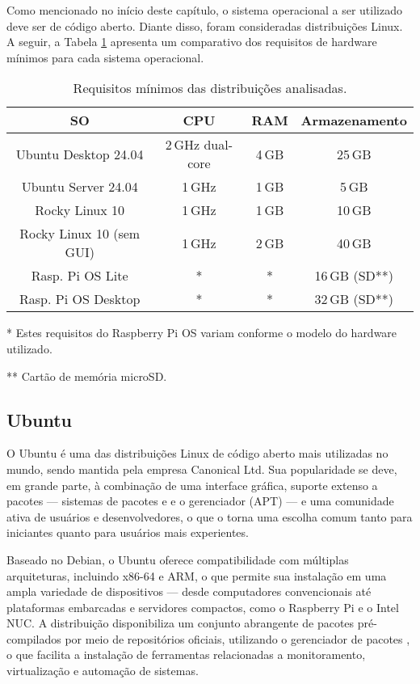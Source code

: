 Como mencionado no início deste capítulo, o sistema operacional a ser utilizado deve ser de código aberto. Diante disso, 
foram consideradas distribuições Linux. A seguir, a Tabela \ref{tab:requisitos-minimos} apresenta um comparativo dos requisitos de hardware mínimos para cada sistema operacional.

\begin{table}[H]
\centering
\caption{Requisitos mínimos das distribuições analisadas.}
\label{tab:requisitos-minimos}
\begin{tabular}{@{}c c c c@{}}
\toprule
\textbf{SO} & \textbf{CPU} & \textbf{RAM} & \textbf{Armazenamento} \\
\midrule
Ubuntu Desktop 24.04 & 2\,GHz dual-core & 4\,GB & 25\,GB \\
Ubuntu Server 24.04 & 1\,GHz & 1\,GB & 5\,GB \\
Rocky Linux 10 & 1\,GHz & 1\,GB & 10\,GB \\
Rocky Linux 10 (sem GUI) & 1\,GHz & 2\,GB & 40\,GB \\
Rasp. Pi OS Lite & * & * & 16\,GB (SD**) \\
Rasp. Pi OS Desktop & * & * & 32\,GB (SD**) \\
\bottomrule
\end{tabular}
\begin{flushleft}
\footnotesize

* Estes requisitos do Raspberry Pi OS variam conforme o modelo do hardware utilizado.

** Cartão de memória microSD.
\end{flushleft}
\end{table}

\subsection{Ubuntu}
\label{subsection:Ubuntu}

O Ubuntu \citep{ubuntudsktp2025} é uma das distribuições Linux de código aberto mais utilizadas no mundo, sendo mantida pela empresa Canonical Ltd. Sua popularidade se deve, em grande parte, à combinação de uma interface gráfica, suporte extenso a pacotes --- sistemas de pacotes  e  e o gerenciador  (APT) ---  e uma comunidade ativa de usuários e desenvolvedores, o que o torna uma escolha comum tanto para iniciantes quanto para usuários mais experientes.

Baseado no Debian, o Ubuntu oferece compatibilidade com múltiplas arquiteturas, incluindo x86-64 e ARM, o que permite sua instalação em uma ampla variedade de dispositivos --- desde computadores convencionais até plataformas embarcadas e servidores compactos, como o Raspberry Pi e o Intel NUC. A distribuição disponibiliza um conjunto abrangente de pacotes pré-compilados por meio de repositórios oficiais, utilizando o gerenciador de pacotes , o que facilita a instalação de ferramentas relacionadas a monitoramento, virtualização e automação de sistemas.

